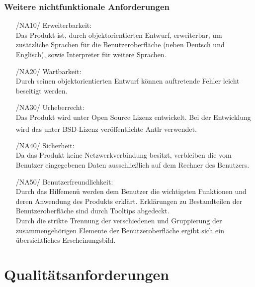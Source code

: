 \documentclass[parskip=full]{scrartcl}
\begin{document}
		\subsubsection{Weitere nichtfunktionale Anforderungen}
		\begin{itemize}
		\item[/NA10/]Erweiterbarkeit: \\
		Das Produkt ist, durch objektorientierten Entwurf, erweiterbar, um zusätzliche Sprachen für die Benutzeroberfläche (neben Deutsch und Englisch), sowie Interpreter für weitere Sprachen.
		\item[/NA20/]Wartbarkeit: \\
		Durch seinen objektorientierten Entwurf können auftretende Fehler leicht beseitigt werden.
		\item[/NA30/]Urheberrecht: \\
		Das Produkt wird unter Open Source Lizenz entwickelt. Bei der Entwicklung wird das unter BSD-Lizenz veröffentlichte Antlr\textsuperscript{\textcopyright} verwendet.
		\item[/NA40/] Sicherheit: \\
		Da das Produkt keine Netzwerkverbindung besitzt, verbleiben die vom Benutzer eingegebenen Daten ausschließlich auf dem Rechner des Benutzers.
		\item[/NA50/]Benutzerfreundlichkeit: \\
		Durch das Hilfemenü werden dem Benutzer die wichtigsten Funktionen und deren Anwendung des Produkts erklärt. Erklärungen zu Bestandteilen der Benutzeroberfläche sind durch \glspl{Tooltip} abgedeckt. \\
		Durch die strikte Trennung der verschiedenen und Gruppierung der zusammengehörigen Elemente der Benutzeroberfläche ergibt sich ein übersichtliches Erscheinungsbild. 
		\end{itemize}
		

\section{Qualitätsanforderungen}
\end{document}
